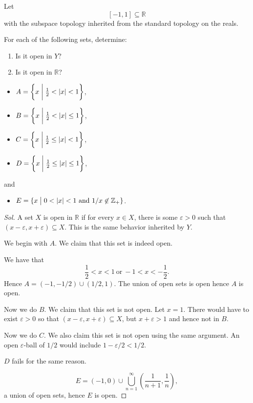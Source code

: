 \documentclass[11pt]{article}
\begin{document}
\begin{prob}
    Let 
    \[
        [-1,1] \subseteq \mathbb R
    \]
    with the subspace topology inherited from 
    the standard topology on the reals. 

    For each of the following sets, determine: 
    \begin{enumerate}
        \item Is it open in $Y$? 
        \item Is it open in $\mathbb R$? 
    \end{enumerate} 
    \begin{itemize}
        \item $A = \left\{x \biggm| \frac{1}{2} < |x| < 1\right\}$, 
        \item $B = \left\{x \biggm| \frac{1}{2} < |x| \leq 1\right\}$, 
        \item $C = \left\{x \biggm| \frac{1}{2} \leq |x| < 1\right\}$, 
        \item $D = \left\{x \biggm| \frac{1}{2} \leq |x| \leq 1\right\}$, 
    \end{itemize}
    and 
    \begin{itemize}
        \item $E = \{x \bigm| 0 < |x| < 1 \ \text{and} \ 1/x
        \not\in \mathbb Z_+\}$.
    \end{itemize}
\end{prob}
\begin{proof}[Sol]
    A set $X$ is open in $\mathbb R$ if for every 
    $x \in X$, there is some $\varepsilon > 0$ 
    such that $(x-\varepsilon, x + \varepsilon) \subseteq X$. 
    This is the same behavior inherited by $Y$. 

    We begin with $A$. 
    We claim 
    that this set is indeed open. 

    We have that 
    \[
        \frac{1}{2} < x < 1 \ \text{or} \ 
        -1 < x < -\frac{1}{2}.  
    \]
    Hence $A = (-1,-1/2) \cup (1/2, 1)$. The union of 
    open sets is open hence $A$ is open. 

    Now we do $B$. We claim that this set is not open. 
    Let $x = 1$. There would have to exist $\varepsilon > 0$
    so that $(x - \varepsilon, x + \varepsilon) \subseteq X$, but 
    $x + \varepsilon > 1$ and hence not in $B$. 

    Now we do $C$. We also claim this set is not open 
    using the same argument. 
    An open $\varepsilon$-ball of $1/2$ would include 
    $1-\varepsilon/2 < 1/2$. 

    $D$ fails for the same reason. 

    \[
        E = (-1,0) \cup \bigcup_{n=1}^\infty 
        \left(\frac{1}{n+1}, \frac{1}{n}\right),
    \]
    a union of open sets, hence $E$ is open.
\end{proof}
\end{document}
